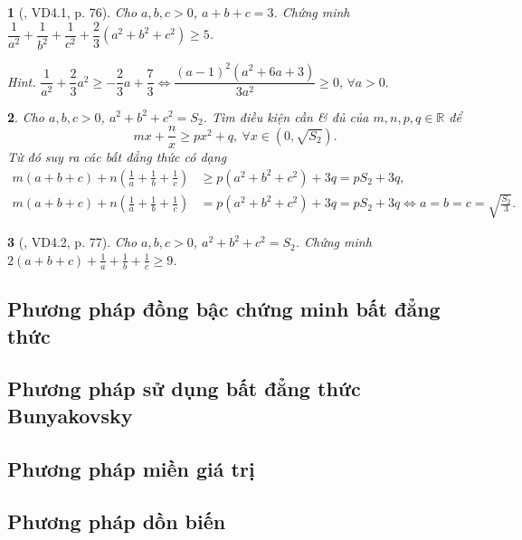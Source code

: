 \documentclass{article}
\newtheorem{baitoan}{}
\begin{document}
\begin{baitoan}[\cite{Son_Nghiep_Trung_Can_bdt}, VD4.1, p. 76]
	Cho $a,b,c > 0$, $a + b + c = 3$. Chứng minh $\dfrac{1}{a^2} + \dfrac{1}{b^2} + \dfrac{1}{c^2} + \dfrac{2}{3}(a^2 + b^2 + c^2)\ge5$.
\end{baitoan}
{\it Hint.} $\dfrac{1}{a^2} + \dfrac{2}{3}a^2\ge-\dfrac{2}{3}a + \dfrac{7}{3}\Leftrightarrow\dfrac{(a - 1)^2(a^2 + 6a + 3)}{3a^2}\ge0$, $\forall a > 0$.

\begin{baitoan}
	Cho $a,b,c > 0$, $a^2 + b^2 + c^2 = S_2$. Tìm điều kiện cần \& đủ của $m,n,p,q\in\mathbb{R}$ để
	\begin{equation*}
		mx + \frac{n}{x}\ge px^2 + q,\ \forall x\in(0,\sqrt{S_2}).
	\end{equation*}
	Từ đó suy ra các bất đẳng thức có dạng
	\begin{align*}
		m(a + b + c) + n\left(\frac{1}{a} + \frac{1}{b} + \frac{1}{c}\right)&\ge p(a^2 + b^2 + c^2) + 3q = pS_2 + 3q,\\
		m(a + b + c) + n\left(\frac{1}{a} + \frac{1}{b} + \frac{1}{c}\right) &= p(a^2 + b^2 + c^2) + 3q = pS_2 + 3q\Leftrightarrow a = b = c = \sqrt{\frac{S_2}{3}}.
	\end{align*}
\end{baitoan}

\begin{baitoan}[\cite{Son_Nghiep_Trung_Can_bdt}, VD4.2, p. 77]
	Cho $a,b,c > 0$, $a^2 + b^2 + c^2 = S_2$. Chứng minh $2(a + b + c) + \frac{1}{a} + \frac{1}{b} + \frac{1}{c}\ge9$.
\end{baitoan}

\subsection{Phương pháp đồng bậc chứng minh bất đẳng thức}

\subsection{Phương pháp sử dụng bất đẳng thức Bunyakovsky}

\subsection{Phương pháp miền giá trị}

\subsection{Phương pháp dồn biến}
\end{document}
